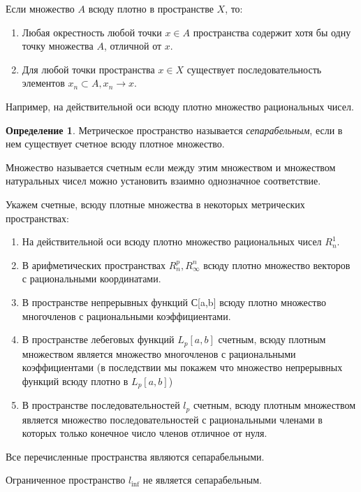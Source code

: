 \documentclass[14pt,a4paper]{extarticle}
\theoremstyle{definition}
\newtheorem{definition}{Определение}[section]
\theoremstyle{remark}
\renewcommand{\[}{\begin{dmath*}[compact]}
\renewcommand{\]}{\end{dmath*}}
\newcommand{\be}{\begin{enumerate}}
\newcommand{\ee}{\end{enumerate}}
\begin{document}
Если множество $A$ всюду плотно в пространстве $X$, то:

\be
  \item Любая окрестность любой точки $x \in A$ пространства содержит хотя
  бы одну точку множества $A$, отличной от $x$.

  \item Для любой точки пространства $x \in X$  существует последовательность
  элементов ${x_n} \subset A, x_n \to x$.
\ee

Например, на действительной оси всюду плотно множество рациональных чисел.

\begin{definition}
  Метрическое пространство называется \textit{сепарабельным},
  если в нем существует счетное всюду плотное множество.
\end{definition}

Множество называется счетным если между этим множеством и множеством
натуральных чисел можно установить взаимно однозначное соответствие.

Укажем счетные, всюду плотные множества в некоторых метрических пространствах:

\begin{enumerate}
  \item На действительной оси всюду плотно множество рациональных чисел $R_n^1$.

  \item В арифметических пространствах $R_n^p, R_\infty^n$ всюду плотно
  множество векторов с рациональными координатами.

  \item В пространстве непрерывных функций С[a,b] всюду плотно множество
  многочленов с рациональными коэффициентами.

  \item В пространстве лебеговых функций $L_p[a,b]$ счетным, всюду плотным
  множеством является множество многочленов с рациональными коэффициентами (в
  последствии мы покажем что множество непрерывных функций всюду плотно в
  $L_p[a,b]$) %

  \item В пространстве последовательностей $l_p$ счетным, всюду плотным
  множеством является множество последовательностей с рациональными членами в
  которых только конечное число членов отличное от нуля. %
\end{enumerate}

Все перечисленные пространства являются сепарабельными.

Ограниченное пространство $l_{\inf}$ не является сепарабельным.
\end{document}
